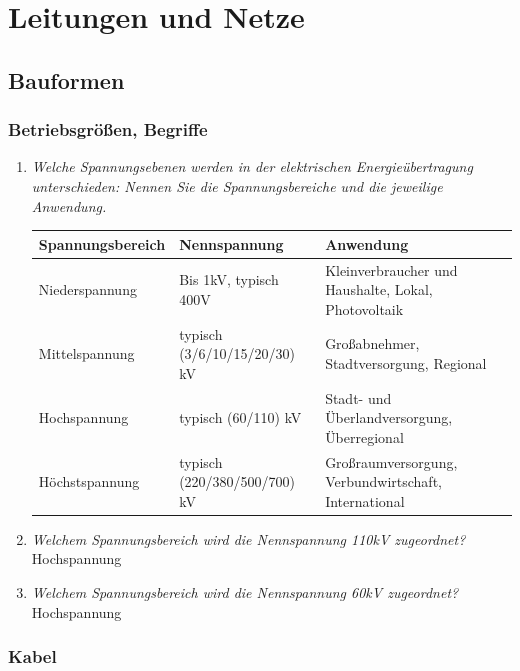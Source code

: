 \documentclass[12pt]{article}
\begin{document}
\section{Leitungen und Netze}
\subsection{Bauformen}
\subsubsection{Betriebsgrößen, Begriffe}
\begin{enumerate}
    \item \textit{Welche Spannungsebenen werden in der elektrischen Energieübertragung unterschieden: 
    Nennen Sie die Spannungsbereiche und die jeweilige Anwendung.}\\
    \begin{table}[!ht]
        \centering
        \begin{tabularx}{\textwidth}{|l|l|X|}
        \hline
            Spannungsbereich & Nennspannung  & Anwendung  \\ \hline
            Niederspannung & Bis 1kV, typisch 400V & Kleinverbraucher und Haushalte, Lokal, Photovoltaik   \\ \hline
            Mittelspannung &  typisch (3/6/10/15/20/30) kV & Großabnehmer, Stadtversorgung, Regional  \\ \hline
            Hochspannung &  typisch (60/110) kV & Stadt- und Überlandversorgung, Überregional  \\ \hline
            Höchstspannung &  typisch (220/380/500/700) kV & Großraumversorgung, Verbundwirtschaft, International  \\ \hline
        \end{tabularx}
    \end{table}
    
    \item \textit{Welchem Spannungsbereich wird die Nennspannung 110kV zugeordnet?}\\
    Hochspannung
    
    \item \textit{Welchem Spannungsbereich wird die Nennspannung 60kV zugeordnet?}\\
    Hochspannung

\end{enumerate}


\subsubsection{Kabel}
\end{document}
